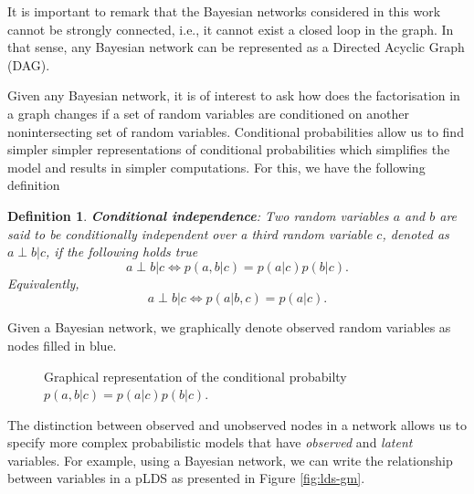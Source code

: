 \documentclass[11pt]{article}
\numberwithin{equation}{section}
\newtheorem{definition}{Definition}[section]
\begin{document}
It is important to remark that the Bayesian networks considered in this work cannot be strongly connected, i.e., it cannot exist a closed loop in the graph. In that sense, any Bayesian network can be represented as a Directed Acyclic Graph (DAG).

Given any Bayesian network, it is of interest to ask how does the factorisation in a graph changes if a set of random variables are conditioned on another nonintersecting set of random variables. Conditional probabilities allow us to find simpler simpler representations of conditional probabilities which simplifies the model and results in simpler computations. For this, we have the following definition


\begin{definition}
	\textbf{Conditional independence}: Two random variables $a$ and $b$ are said to be conditionally independent over a third random variable $c$, denoted as $a \perp b \vert c$, if the following holds true
	\begin{equation}
		a \perp b \vert c \iff p(a, b \vert c) = p(a \vert c) p(b \vert c).
	\end{equation}
	Equivalently,
	\begin{equation}
		a \perp b \vert c \iff p(a \vert b, c) = p(a \vert c).
	\end{equation}
\end{definition}

Given a Bayesian network, we graphically denote observed random variables as nodes filled in blue. 

\begin{figure}[h!]
	\centering
	
	\caption{Graphical representation of the conditional probabilty $p(a, b\vert c) = p(a \vert c) p(b \vert c)$.}
	\label{fig:bayes-net-3}
\end{figure}


The distinction between observed and unobserved nodes in a network allows us to specify more complex probabilistic models that have \textit{observed} and \textit{latent} variables. For example, using a Bayesian network, we can write the relationship between variables in a pLDS as presented in Figure \ref{fig:lds-gm}.
\end{document}
